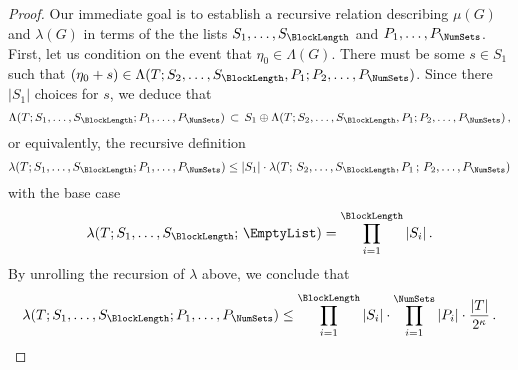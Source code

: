 \begin{proof}
Our immediate goal is to establish a recursive relation describing $\mu(G)$ and $\lambda(G)$ in terms of 
the the lists $\Sfull$ and $\Pfull$. 
First, let us condition on the event that $\eta_0 \in \Lambda(G)$. 
There must be some $s \in S_1$ such that $(\eta_0 + s) \in \Lambda(T; \SS{2}, P_1; \PP{2})$.
Since there $|S_1|$ choices for $s$, we deduce that
\[
    \Lambda(T; \Sfull; \Pfull) \,\subset\, S_1 \oplus \Lambda(T; \SS{2}, P_1; \PP{2})
    \,,
\]
or equivalently, the recursive definition
\[
    \lambda(T; \Sfull; \Pfull) \leq |S_1| \cdot \lambda(T;\, \SS{2}, P_1\,;\, \PP{2})
\]
with the base case 
\[
    \lambda(T; \Sfull;\, \EmptyList) = \prod_{i=1}^\BlockLength |S_i|
    \,.
\]
By unrolling the recursion of $\lambda$ above, we conclude that
\begin{equation}\label{eq:lambda-expr-lookahead}
    \lambda(T; \Sfull; \Pfull) 
    \leq \prod_{i=1}^\BlockLength |S_i| \cdot 
        \prod_{i=1}^{\NumSets}|P_i| \cdot 
        \frac{|T|}{2^\kappa}
        \,.
\end{equation}



\end{proof}
